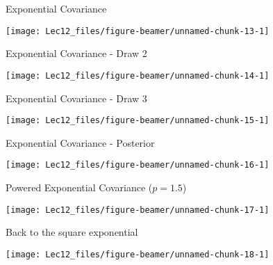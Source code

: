 \documentclass[11pt,ignorenonframetext,]{beamer}
\begin{document}
\begin{frame}{Exponential Covariance}
\protect\hypertarget{exponential-covariance}{}

\begin{center}\texttt{[image: Lec12\_files/figure-beamer/unnamed-chunk-13-1]} \end{center}

\end{frame}

\begin{frame}{Exponential Covariance - Draw 2}
\protect\hypertarget{exponential-covariance---draw-2}{}

\begin{center}\texttt{[image: Lec12\_files/figure-beamer/unnamed-chunk-14-1]} \end{center}

\end{frame}

\begin{frame}{Exponential Covariance - Draw 3}
\protect\hypertarget{exponential-covariance---draw-3}{}

\begin{center}\texttt{[image: Lec12\_files/figure-beamer/unnamed-chunk-15-1]} \end{center}

\end{frame}

\begin{frame}{Exponential Covariance - Posterior}
\protect\hypertarget{exponential-covariance---posterior}{}

\begin{center}\texttt{[image: Lec12\_files/figure-beamer/unnamed-chunk-16-1]} \end{center}

\end{frame}

\begin{frame}{Powered Exponential Covariance (\(p=1.5\))}
\protect\hypertarget{powered-exponential-covariance-p1.5}{}

\begin{center}\texttt{[image: Lec12\_files/figure-beamer/unnamed-chunk-17-1]} \end{center}

\end{frame}

\begin{frame}{Back to the square exponential}
\protect\hypertarget{back-to-the-square-exponential}{}

\begin{center}\texttt{[image: Lec12\_files/figure-beamer/unnamed-chunk-18-1]} \end{center}

\end{frame}
\end{document}
